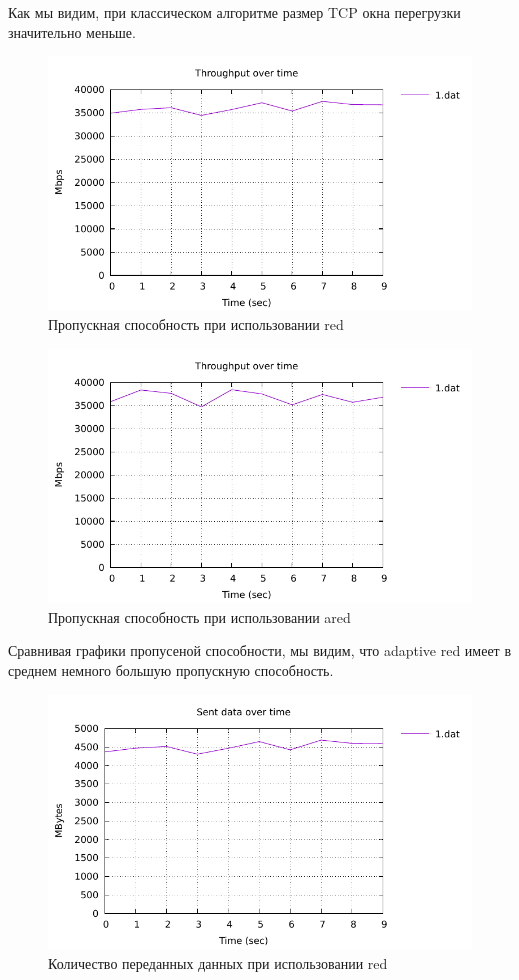 Как мы видим, при классическом алгоритме размер TCP окна перегрузки значительно меньше. 


\begin{figure}[!ht]
  \centering
  \includegraphics[width=0.6\linewidth]{image/red/throughput_red.pdf}
  \caption{Пропускная способность при использовании red}
  \label{fig:3.11}
\end{figure}

\begin{figure}[!ht]
  \centering
  \includegraphics[width=0.6\linewidth]{image/ared/throughput_ared.pdf}
  \caption{Пропускная способность при использовании ared}
  \label{fig:3.12}
\end{figure}

Сравнивая графики пропусеной способности, мы видим, что  adaptive red имеет в среднем немного большую пропускную способность. 

\begin{figure}[!ht]
  \centering
  \includegraphics[width=0.6\linewidth]{image/red/bytes_red.pdf}
  \caption{Количество переданных данных при использовании red}
  \label{fig:3.13}
\end{figure}

